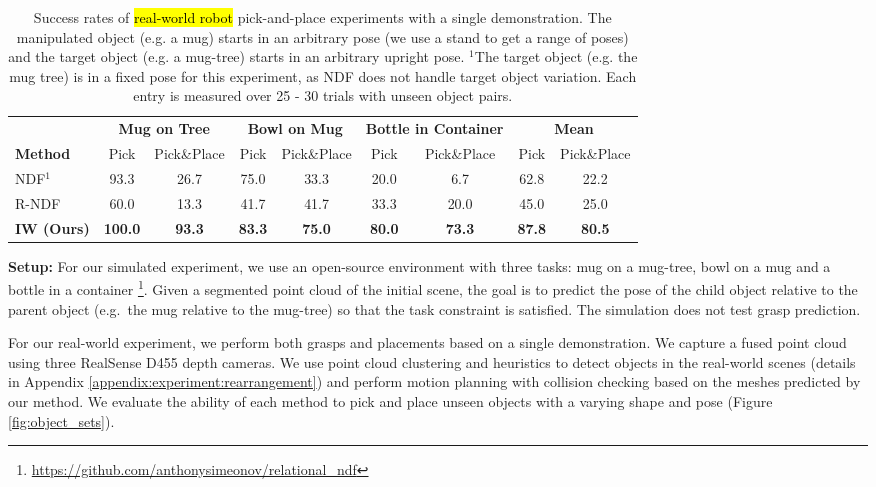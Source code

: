 \documentclass{article}
\begin{document}
\begin{table}[t!]
    \centering
    \begin{tabular}{lcccccc|cc}
         \toprule
          & \multicolumn{2}{c}{\textbf{Mug on Tree}} & \multicolumn{2}{c}{\textbf{Bowl on Mug}} & \multicolumn{2}{c}{\textbf{Bottle in Container}} & \multicolumn{2}{c}{\textbf{Mean}} \\
         \textbf{Method} & Pick & Pick\&Place & Pick & Pick\&Place & Pick & Pick\&Place & Pick & Pick\&Place \\
         \midrule
         NDF$^1$ \cite{simeonov22neural} & 93.3 & 26.7 & 75.0 & 33.3 & 20.0 & 6.7 & 62.8 & 22.2 \\
         R-NDF \cite{simeonov22se} & 60.0 & 13.3 & 41.7 & 41.7 & 33.3 & 20.0 & 45.0 & 25.0 \\
         \textbf{IW (Ours)} & \textbf{100.0} & \textbf{93.3} & \textbf{83.3} & \textbf{75.0} & \textbf{80.0} & \textbf{73.3} & \textbf{87.8} & \textbf{80.5} \\
         \bottomrule
    \end{tabular}
    \caption{Success rates of \hl{real-world robot} pick-and-place experiments with a single demonstration. The manipulated object (e.g. a mug) starts in an arbitrary pose (we use a stand to get a range of poses) and the target object (e.g. a mug-tree) starts in an arbitrary upright pose. $^1$The target object (e.g. the mug tree) is in a fixed pose for this experiment, as NDF does not handle target object variation. Each entry is measured over 25 - 30 trials with unseen object pairs.}
    \label{tab:real_world}
\end{table}

\textbf{Setup:} For our simulated experiment, we use an open-source environment with three tasks: mug on a mug-tree, bowl on a mug and a bottle in a  container \cite{simeonov22se}\footnote{\url{https://github.com/anthonysimeonov/relational_ndf}}. Given a segmented point cloud of the initial scene, the goal is to predict the pose of the child object relative to the parent object (e.g.~the mug relative to the mug-tree) so that the task constraint is satisfied. The simulation does not test grasp prediction.

For our real-world experiment, we perform both grasps and placements based on a single demonstration. We capture a fused point cloud using three RealSense D455 depth cameras. We use point cloud clustering and heuristics to detect objects in the real-world scenes (details in Appendix \ref{appendix:experiment:rearrangement}) and perform motion planning with collision checking based on the meshes predicted by our method. We evaluate the ability of each method to pick and place unseen objects with a varying shape and pose (Figure \ref{fig:object_sets}).
\end{document}

